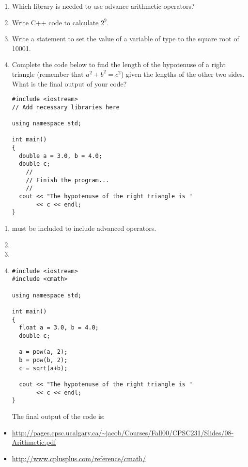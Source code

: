 \begin{enumerate}
\item Which  library is needed to use advance arithmetic operators?

\item Write C++ code to calculate $2^9$.

\item Write a statement to set the value of a variable of type  to the square root of 10001.

\item Complete the code below to find the length of the hypotenuse of a right triangle (remember that $a^2 + b^2 = c^2$) given the lengths of the other two sides. What is the final output of your code? \nopagebreak[4]

\noindent\begin{minipage}{\linewidth}\begin{lstlisting}
#include <iostream>
// Add necessary libraries here

using namespace std;

int main()
{
  double a = 3.0, b = 4.0;
  double c;
	//
	// Finish the program...
	//
  cout << "The hypotenuse of the right triangle is "
       << c << endl;
}
\end{lstlisting}\end{minipage}

\end{enumerate}

\begin{enumerate}
\item {} must be included to include advanced operators.
\item {}
\item {}
\item
\noindent\begin{minipage}{\linewidth}\begin{lstlisting}
#include <iostream>
#include <cmath>

using namespace std;

int main()
{
  float a = 3.0, b = 4.0;
  double c;
	
  a = pow(a, 2);
  b = pow(b, 2);
  c = sqrt(a+b);

  cout << "The hypotenuse of the right triangle is "
       << c << endl;
}
\end{lstlisting}\end{minipage}

The final output of the code is: 


\end{enumerate}

\begin{itemize}
\item \url{http://pages.cpsc.ucalgary.ca/~jacob/Courses/Fall00/CPSC231/Slides/08-Arithmetic.pdf}
\item \url{http://www.cplusplus.com/reference/cmath/}
\end{itemize}
